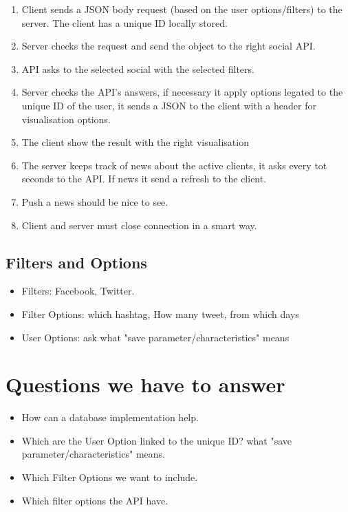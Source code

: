 \documentclass[]{article}
\begin{document}
\begin{enumerate}
\item Client sends a JSON body request (based on the user options/filters) to the server. The client has a unique ID locally stored. 
\item Server checks the request and send the object to the right social API.
\item API asks to the selected social with the selected filters.
\item Server checks the API's answers, if necessary it apply options legated to the unique ID of the user, it sends a JSON to the client with a header for visualisation options.
\item The client show the result with the right visualisation
\item The server keeps track of news about the active clients, it asks every tot seconds to the API. If news it send a refresh to the client.
\item Push a news should be nice to see.
\item Client and server must close connection in a smart way. 
\end{enumerate}

\subsection*{Filters and Options}
\begin{itemize}
\item Filters: Facebook, Twitter.
\item Filter Options: which hashtag, How many tweet, from which days
\item User Options:  ask what "save parameter/characteristics" means
\end{itemize}

\section*{Questions we have to answer}
\begin{itemize}
\item How can a database implementation help.
\item Which are the User Option linked to the unique ID? what "save parameter/characteristics" means.
\item Which Filter Options we want to include.
\item Which filter options the API have.
 
\end{itemize}
\end{document}
